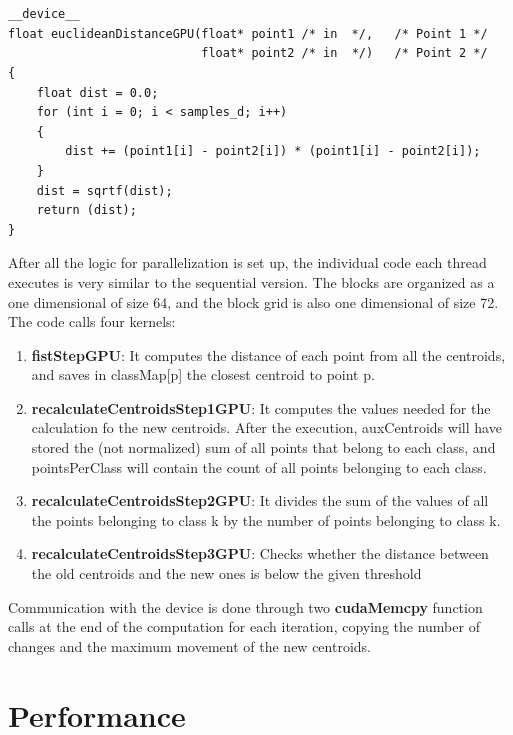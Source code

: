 \documentclass{article}
\begin{document}
\begin{lstlisting}

   
__device__
float euclideanDistanceGPU(float* point1 /* in  */,   /* Point 1 */
                           float* point2 /* in  */)   /* Point 2 */
{
	float dist = 0.0;
	for (int i = 0; i < samples_d; i++)
	{
		dist += (point1[i] - point2[i]) * (point1[i] - point2[i]);
	}
	dist = sqrtf(dist);
	return (dist);
}
\end{lstlisting}
After all the logic for parallelization is set up, the individual code each thread executes is very similar to the sequential version. The blocks are organized as a one dimensional of size 64, and the block grid is also one dimensional of size 72. The code calls four kernels:
\begin{enumerate}
    \item \textbf{fistStepGPU}: It computes the distance of each point from all the centroids, and saves in classMap[p] the closest centroid to point p.
    \item \textbf{recalculateCentroidsStep1GPU}: It computes the values needed for the calculation fo the new centroids. After the execution, auxCentroids will have stored the (not normalized) sum of all points that belong to each class, and pointsPerClass will contain the count of all points belonging to each class.
    \item \textbf{recalculateCentroidsStep2GPU}: It divides the sum of the values of all the points belonging to class k by the number of points belonging to class k.
    \item \textbf{recalculateCentroidsStep3GPU}: Checks whether the distance between the old centroids and the new ones is below the given threshold
\end{enumerate}
Communication with the device is done through two \textbf{cudaMemcpy} function calls at the end of the computation for each iteration, copying the number of changes and the maximum movement of the new centroids.
\section*{Performance}
\end{document}
